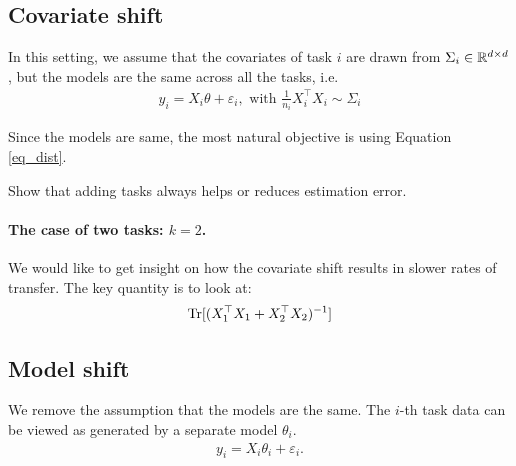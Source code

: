 \documentclass{article}
\begin{document}
\subsection{Covariate shift}

In this setting, we assume that the covariates of task $i$ are drawn from $\Sigma_i \in \mathbb{R}^{d \times d}$, but the models are the same across all the tasks, i.e.
\begin{align}
  y_i = X_i \theta + \varepsilon_i, \mbox{ with } \frac 1 {n_i} X_i^{\top}X_i \sim \Sigma_i
\end{align}

Since the models are same, the most natural objective is using Equation \eqref{eq_dist}.

\begin{proposition}
  Show that adding tasks always helps or reduces estimation error.
\end{proposition}

\paragraph{The case of two tasks: $k = 2$.} We would like to get insight on how the covariate shift results in slower rates of transfer. The key quantity is to look at:
\begin{align}
  \operatorname{Tr}[(X_1^{\top}X_1 + X_2^{\top} X_2)^{-1}]
\end{align}

\subsection{Model shift}

We remove the assumption that the models are the same. The $i$-th task data can be viewed as generated by a separate model $\theta_i$. 
\begin{align}
  y_i = X_i \theta_i + \varepsilon_i.
\end{align}

\end{document}
